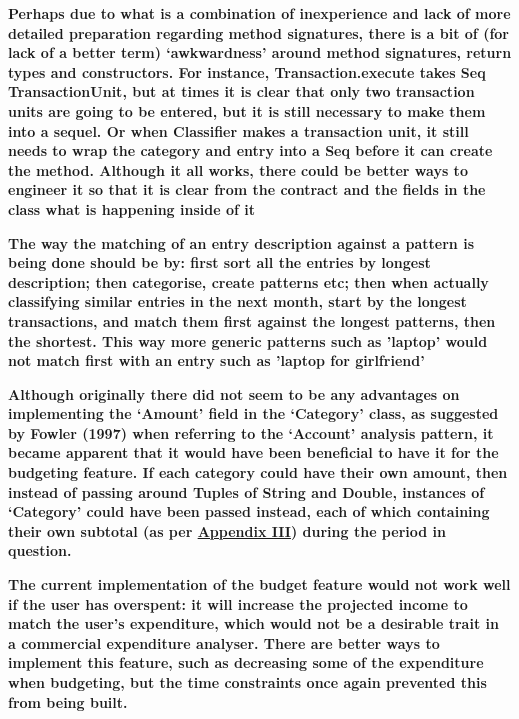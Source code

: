 \textbf{Perhaps due to what is a combination of inexperience and lack of more
detailed preparation regarding method signatures, there is a bit of (for lack
of a better term) `awkwardness' around method signatures, return types and
constructors. For instance, Transaction.execute takes Seq TransactionUnit, but
at times it is clear that only two transaction units are going to be entered,
but it is still necessary to make them into a sequel. Or when Classifier makes
a transaction unit, it still needs to wrap the category and entry into a Seq
before it can create the method. Although it all works, there could be better
ways to engineer it so that it is clear from the contract and the fields in the
class what is happening inside of it}

\textbf{The way the matching of an entry description against a pattern is being
done should be by: first sort all the entries by longest description;
then categorise, create patterns etc; then when actually classifying similar
entries in the next month, start by the longest transactions, and match them
first against the longest patterns, then the shortest. This way more generic
patterns such as 'laptop' would not match first with an entry such as 'laptop
for girlfriend'}


\textbf{Although originally there did not seem to be any advantages on
implementing the `Amount' field in the `Category' class, as suggested by Fowler
(1997) when referring to the `Account' analysis pattern, it became apparent
that it would have been beneficial to have it for the budgeting feature. If
each category could have their own amount, then instead of passing around
Tuples of String and Double, instances of `Category' could have been passed
instead, each of which containing their own subtotal (as per \hyperref[appendix3]{Appendix III})
during the period in question.}

\textbf{The current implementation of the budget feature would not work well if
the user has overspent: it will increase the projected income to match the
user's expenditure, which would not be a desirable trait in a commercial
expenditure analyser. There are better ways to implement this feature, such as
decreasing some of the expenditure when budgeting, but the time constraints
once again prevented this from being built.}
